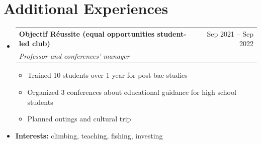 \documentclass[letterpaper,11pt]{article}
\makeatletter
\newcommand{\resumeItem}[1]{
  \item\small{
    {#1 \vspace{-2pt}}
  }
}
\newcommand{\resumeSubheading}[4]{
  \vspace{-2pt}\item
    \begin{tabular*}{0.97\textwidth}[t]{l@{\extracolsep{\fill}}r}
      \textbf{#1} & #2 \\
      \textit{\small#3} & \textit{\small #4} \\
    \end{tabular*}\vspace{-7pt}
}
\newcommand{\resumeSubHeadingListStart}{\begin{itemize}[leftmargin=0.15in, label={}]}
\newcommand{\resumeSubHeadingListEnd}{\end{itemize}}
\newcommand{\resumeItemListStart}{\begin{itemize}}
\newcommand{\resumeItemListEnd}{\end{itemize}\vspace{-5pt}}
\makeatother
\begin{document}
\section{Additional Experiences}
  \resumeSubHeadingListStart
    \resumeSubheading
      {Objectif Réussite (equal opportunities student-led club)}{Sep 2021 -- Sep 2022}
      {Professor and conferences' manager}{}
      \resumeItemListStart
        \resumeItem{Trained 10 students over 1 year for post-bac studies}
        \resumeItem{Organized 3 conferences about educational guidance for high school students}
        \resumeItem{Planned outings and cultural trip}
      \resumeItemListEnd

    \item \textbf{Interests:} climbing, teaching, fishing, investing
  \resumeSubHeadingListEnd
\end{document}
